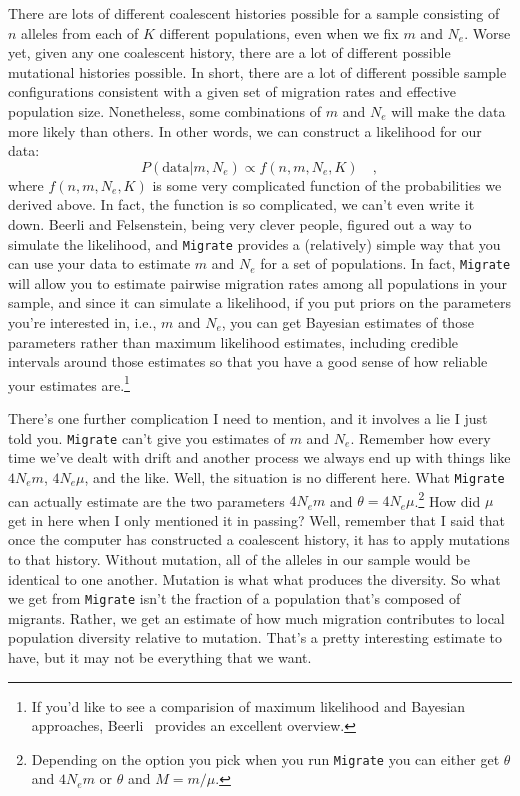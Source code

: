 \documentclass[12pt]{article}
\begin{document}
There are lots of different coalescent histories possible for a sample
consisting of $n$ alleles from each of $K$ different populations, even
when we fix $m$ and $N_e$. Worse yet, given any one coalescent
history, there are a lot of different possible mutational histories
possible. In short, there are a lot of different possible sample
configurations consistent with a given set of migration rates and
effective population size. Nonetheless, some combinations of $m$ and
$N_e$ will make the data more likely than others. In other words, we
can construct a likelihood for our data:
\[
P(\mbox{data}|m, N_e) \propto f(n, m, N_e, K) \quad ,
\]
where $f(n, m, N_e,K)$ is some very complicated function of the
probabilities we derived above. In fact, the function is so
complicated, we can't even write it down. Beerli and Felsenstein,
being very clever people, figured out a way to simulate the
likelihood, and {\tt Migrate} provides a (relatively) simple way that
you can use your data to estimate $m$ and $N_e$ for a set of
populations. In fact, {\tt Migrate} will allow you to estimate
pairwise migration rates among all populations in your sample, and
since it can simulate a likelihood, if you put priors on the
parameters you're interested in, i.e., $m$ and $N_e$, you can get
Bayesian estimates of those parameters rather than maximum likelihood
estimates, including credible intervals around those estimates so that
you have a good sense of how reliable your estimates are.\footnote{If
  you'd like to see a comparision of maximum likelihood and Bayesian
  approaches, Beerli~\cite{Beerli-2006} provides an excellent
  overview.}

There's one further complication I need to mention, and it involves a
lie I just told you. {\tt Migrate} can't give you estimates of $m$ and
$N_e$. Remember how every time we've dealt with drift and another
process we always end up with things like $4N_em$, $4N_e\mu$, and the
like. Well, the situation is no different here. What {\tt Migrate} can
actually estimate are the two parameters $4N_em$ and
$\theta=4N_e\mu$.\footnote{Depending on the option you pick when you
  run {\tt Migrate} you can either get $\theta$ and $4N_em$ or
  $\theta$ and $M=m/\mu$.} How did $\mu$ get in here when I only
mentioned it in passing? Well, remember that I said that once the
computer has constructed a coalescent history, it has to apply
mutations to that history. Without mutation, all of the alleles in our
sample would be identical to one another. Mutation is what what
produces the diversity. So what we get from {\tt Migrate} isn't the
fraction of a population that's composed of migrants. Rather, we get
an estimate of how much migration contributes to local population
diversity relative to mutation. That's a pretty interesting estimate
to have, but it may not be everything that we want.
\end{document}
